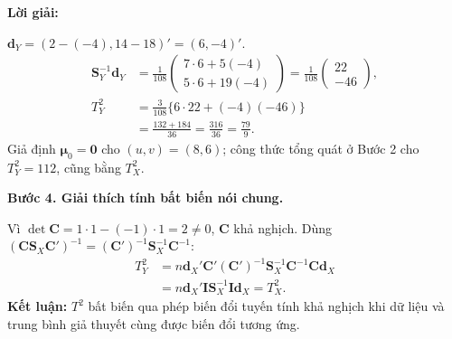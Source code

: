 \documentclass[11pt,a4paper]{article}
\renewcommand{\boldsymbol}[1]{\symbf{#1}}
\newenvironment{solution}{%
  \par\medskip\noindent\textbf{Lời giải:}\par\nobreak\smallskip\noindent\ignorespaces
}{\par}
\newcommand{\step}[2]{\par\medskip\noindent\textbf{Bước #1. #2}\par\nopagebreak[4]\smallskip\noindent}
\begin{document}
\begin{solution}
\begin{enumerate}[label=\textbf{\alph*)}]
$\mathbf{d}_Y=(2-(-4),14-18)'=(6,-4)'$.
\begin{align*}
\mathbf{S}_Y^{-1}\mathbf{d}_Y
&=\frac1{108}\begin{pmatrix}7\cdot6+5(-4)\\5\cdot6+19(-4)\end{pmatrix}
=\frac1{108}\begin{pmatrix}22\\-46\end{pmatrix},\\
T_Y^2&=\frac3{108}\{6\cdot22+(-4)(-46)\}\\
&=\frac{132+184}{36}=\frac{316}{36}=\frac{79}{9}.
\end{align*}
Giả định $\boldsymbol{\mu}_0=\mathbf{0}$ cho $(u,v)=(8,6)$;
công thức tổng quát ở Bước 2 cho $T_Y^2=112$, cũng bằng $T_X^2$.
\step{4}{Giải thích tính bất biến nói chung.}
Vì $\det\mathbf{C}=1\cdot1-(-1)\cdot1=2\ne0$, $\mathbf{C}$ khả nghịch.
Dùng $(\mathbf{C}\mathbf{S}_X\mathbf{C}')^{-1}
=(\mathbf{C}')^{-1}\mathbf{S}_X^{-1}\mathbf{C}^{-1}$:
\begin{align*}
T_Y^2
&=n\mathbf{d}_X'\mathbf{C}'
 (\mathbf{C}')^{-1}\mathbf{S}_X^{-1}\mathbf{C}^{-1}\mathbf{C}\mathbf{d}_X\\
&=n\mathbf{d}_X'\mathbf{I}\mathbf{S}_X^{-1}\mathbf{I}\mathbf{d}_X=T_X^2.
\end{align*}
\textbf{Kết luận:} $T^2$ bất biến qua phép biến đổi tuyến tính khả nghịch
khi dữ liệu và trung bình giả thuyết cùng được biến đổi tương ứng.
\end{enumerate}
\end{solution}
\end{document}
